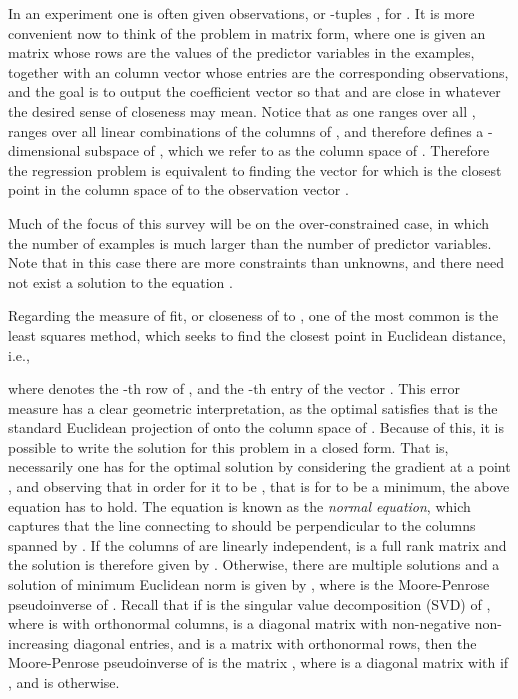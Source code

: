 \documentclass[11pt]{article}
\begin{document}
In an experiment one is often given  observations, or 
-tuples , for . It
is more convenient now to think of the problem in matrix form, where
one is given an  matrix  whose rows are the values of the
predictor variables in the  examples, together with an 
column vector  whose entries are the corresponding observations, and
the goal is to output the coefficient vector  so that  and 
are close in whatever the desired sense of closeness may mean. Notice
that as one ranges over all ,  ranges over
all linear combinations of the  columns of , and therefore defines
a -dimensional subspace of , which we refer to as the column
space of . Therefore the regression
problem is equivalent to finding the vector  for which  is the closest
point in the column space of  to the observation vector . 

Much of the focus of this survey will be on the over-constrained case, in which
the number  of examples is much larger than the number  of predictor
variables. Note that in this case there are more constraints than unknowns,
and there need not exist a solution  to the equation . 

Regarding the measure of fit, or closeness of  to , one of the most
common is the least squares method, which seeks to find the closest point
in Euclidean distance, i.e., 

 where  denotes the -th row of , and  the -th
entry of the vector . This error measure
has a clear geometric interpretation, 
as the optimal  satisfies that  is the standard Euclidean
projection of  onto the column space of . Because of this, it is possible
to write the solution for this problem in a closed form. 
That is,
necessarily one has  for the optimal solution  by 
considering the gradient at a point , and observing that in order for it
to be , that is for  to be a minimum, the above equation has to hold. The
equation  is known as the {\it normal equation}, which
captures that the line connecting  to  should be perpendicular to the
columns spanned by . If
the columns of  are linearly independent,  is a full rank 
matrix and the solution is therefore given by . Otherwise,
there are multiple solutions and a solution  of minimum Euclidean norm
is given by , where  is the Moore-Penrose pseudoinverse
of . Recall that if  is the singular value decomposition (SVD)
of , where  is  with orthonormal columns,  is a diagonal
 matrix with non-negative non-increasing diagonal entries, and 
is a  matrix with orthonormal rows, then the Moore-Penrose pseudoinverse of 
is the  matrix , where  is a  diagonal matrix with  if ,
and is  otherwise. 
\end{document}
